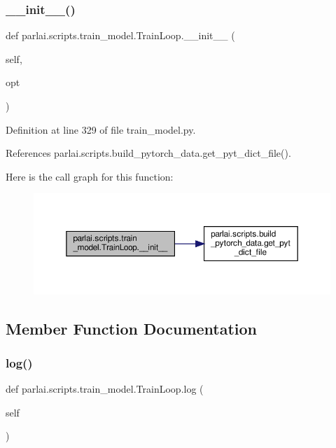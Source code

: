 \subsubsection{\texorpdfstring{\+\_\+\+\_\+init\+\_\+\+\_\+()}{\_\_init\_\_()}}
{\footnotesize\ttfamily def parlai.\+scripts.\+train\+\_\+model.\+Train\+Loop.\+\_\+\+\_\+init\+\_\+\+\_\+ (\begin{DoxyParamCaption}\item[{}]{self,  }\item[{}]{opt }\end{DoxyParamCaption})}



Definition at line 329 of file train\+\_\+model.\+py.



References parlai.\+scripts.\+build\+\_\+pytorch\+\_\+data.\+get\+\_\+pyt\+\_\+dict\+\_\+file().

Here is the call graph for this function\+:
\nopagebreak
\begin{figure}[H]
\begin{center}
\leavevmode
\includegraphics[width=350pt]{classparlai_1_1scripts_1_1train__model_1_1TrainLoop_a87a9194a461efe30e8b4de6cd4036699_cgraph}
\end{center}
\end{figure}


\subsection{Member Function Documentation}
\mbox{\label{classparlai_1_1scripts_1_1train__model_1_1TrainLoop_a8ef64c11f101d087ceb83d21621b9665}} 
\subsubsection{\texorpdfstring{log()}{log()}}
{\footnotesize\ttfamily def parlai.\+scripts.\+train\+\_\+model.\+Train\+Loop.\+log (\begin{DoxyParamCaption}\item[{}]{self }\end{DoxyParamCaption})}

